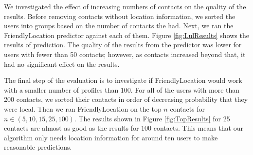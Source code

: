 We investigated the effect of increasing numbers of contacts on the quality of
the results.
Before removing contacts without location information, we sorted the users into
groups based on the number of contacts the had.
Next, we ran the FriendlyLocation predictor against each of them.
Figure \ref{fig:LulResults} shows the results of prediction.
The quality of the results from the predictor was lower for users with fewer
than 50 contacts; however, as contacts increased beyond that, it had no
significant effect on the results.


The final step of the evaluation is to investigate if FriendlyLocation would
work with a smaller number of profiles than 100.
For all of the users with more than 200 contacts, we sorted their contacts in
order of decreasing probability that they were local.
Then we ran FriendlyLocation on the top \(n\) contacts for
\(n\in (5,10,15,25,100)\).
The results shown in Figure \ref{fig:TopResults} for 25 contacts are almost as
good as the results for 100 contacts. This means that our algorithm only needs
location information for around ten users to make reasonable predictions.


